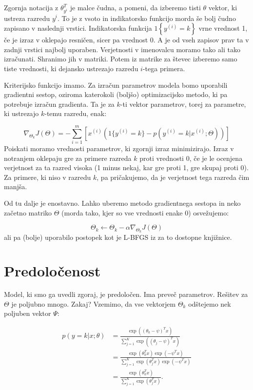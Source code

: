 Zgornja notacija z $\theta_{y^{i}}^T$ je malce čudna, a pomeni, da izberemo tisti $\theta$ vektor, ki ustreza razredu $y^{i}$. To je z vsoto in indikatorsko funkcijo morda še bolj čudno zapisano v naslednji vrstici. Indikatorska funkcija $1\left\{y^{(i)} = k\right\}$ vrne vrednost 1, če je izraz v oklepajo resničen, sicer pa vrednost 0. A je od vseh zapisov prav ta v zadnji vrstici najbolj uporaben. Verjetnosti v imenovalcu moramo tako ali tako izračunati. Shranimo jih v matriki. Potem iz matrike za števec izberemo samo tiste vrednosti, ki dejansko ustrezajo razredu $i$-tega primera.

Kriterijsko funkcijo imamo. Za izračun parametrov modela bomo uporabili gradientni sestop, oziroma katerokoli (boljšo) optimizacijsko metodo, ki pa potrebuje izračun gradienta. Ta je za $k$-ti vektor parametrov, torej za parametre, ki ustrezajo $k$-temu razredu, enak:

\begin{equation}
\nabla_{\Theta_k} J(\Theta) = - \sum_{i=1}^{m}{ \left[ x^{(i)} \left( 1\{ y^{(i)} = k\}  - p(y^{(i)} = k | x^{(i)}; \Theta) \right) \right] }
\end{equation}
%
Poiskati moramo vrednosti parametrov, ki zgornji izraz minimizirajo. Izraz v notranjem oklepaju gre za primere razreda $k$ proti vrednosti 0, če je le ocenjena verjetnost za ta razred visoka (1 minus nekaj, kar gre proti 1, gre skupaj proti 0). Za primere, ki niso v razredu $k$, pa pričakujemo, da je verjetnost tega razreda čim manjša.

Od tu dalje je enostavno. Lahko uberemo metodo gradientnega sestopa in neko začetno matriko $\Theta$ (morda tako, kjer so vse vrednosti enake 0) osvežujemo:

$$ \Theta_k\leftarrow\Theta_k-\alpha\nabla_{\Theta_k} J(\Theta) $$
%
ali pa (bolje) uporabilo postopek kot je L-BFGS iz za to dostopne knjižnice.

\section{Predoločenost}

Model, ki smo ga uvedli zgoraj, je predoločen. Ima preveč parametrov. Rešitev za $\Theta$ je poljubno mnogo. Zakaj? Vzemimo, da vse vektorjem $\Theta_k$ odštejemo nek poljuben vektor $\Psi$:

\begin{equation}
\begin{split}
p(y = k | x ; \theta)
&= \frac{\exp((\theta_k-\psi)^T x)}{\sum_{j=1}^K \exp( (\theta_j-\psi)^T x)}  \\
&= \frac{\exp(\theta_k^T x) \exp(-\psi^T x)}{\sum_{j=1}^K \exp(\theta_j^T x) \exp(-\psi^T x)} \\
&= \frac{\exp(\theta_k^T x)}{\sum_{j=1}^K \exp(\theta_j^T x)}.
\end{split}
\end{equation}

